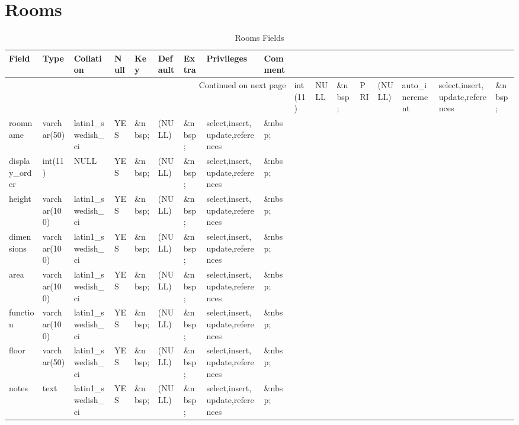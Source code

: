 \documentclass[tablesignature,landscape]{scrartcl}
\begin{document}
\section{Rooms}
\label{sec-22}


\begin{longtable}{|l|l|l|l|l|l|l|l|l|}
\caption{Rooms Fields} \label{tbl:roomsfields}\\
\hline
 Field             &  Type          &  Collation                &  Null     &  Key      &  Default  &  Extra              &  Privileges                       &  Comment \\
\hline
\endhead
\hline\multicolumn{9}{r}{Continued on next page}\
\endfoot
\endlastfoot
\hline
 roomid            &  int(11)       &  NULL                     &  \&nbsp;  &  PRI      &  (NULL)   &  auto\_{}increment  &  select,insert,update,references  &  \&nbsp;  \\
 roomname          &  varchar(50)   &  latin1\_{}swedish\_{}ci  &  YES      &  \&nbsp;  &  (NULL)   &  \&nbsp;            &  select,insert,update,references  &  \&nbsp;  \\
 display\_{}order  &  int(11)       &  NULL                     &  YES      &  \&nbsp;  &  (NULL)   &  \&nbsp;            &  select,insert,update,references  &  \&nbsp;  \\
 height            &  varchar(100)  &  latin1\_{}swedish\_{}ci  &  YES      &  \&nbsp;  &  (NULL)   &  \&nbsp;            &  select,insert,update,references  &  \&nbsp;  \\
 dimensions        &  varchar(100)  &  latin1\_{}swedish\_{}ci  &  YES      &  \&nbsp;  &  (NULL)   &  \&nbsp;            &  select,insert,update,references  &  \&nbsp;  \\
 area              &  varchar(100)  &  latin1\_{}swedish\_{}ci  &  YES      &  \&nbsp;  &  (NULL)   &  \&nbsp;            &  select,insert,update,references  &  \&nbsp;  \\
 function          &  varchar(100)  &  latin1\_{}swedish\_{}ci  &  YES      &  \&nbsp;  &  (NULL)   &  \&nbsp;            &  select,insert,update,references  &  \&nbsp;  \\
 floor             &  varchar(50)   &  latin1\_{}swedish\_{}ci  &  YES      &  \&nbsp;  &  (NULL)   &  \&nbsp;            &  select,insert,update,references  &  \&nbsp;  \\
 notes             &  text          &  latin1\_{}swedish\_{}ci  &  YES      &  \&nbsp;  &  (NULL)   &  \&nbsp;            &  select,insert,update,references  &  \&nbsp;  \\

\end{longtable}
\end{document}

